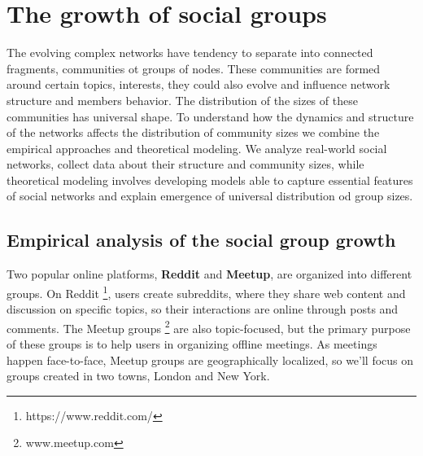 \chapter{The growth of social groups}
\label{Ch:Groups}

The evolving complex networks have tendency to separate into connected fragments, communities ot groups of nodes. These communities are formed around certain topics, interests, they could also evolve and influence network structure and members behavior. The distribution of the sizes of these communities has universal shape. To understand how the dynamics and structure of the networks affects the distribution of community sizes we combine the empirical approaches and theoretical modeling. We analyze real-world social networks, collect data about their structure and community sizes, while theoretical modeling involves developing models able to capture essential features of social networks and explain emergence of universal distribution od group sizes.


\section{Empirical analysis of the social group growth}

Two popular online platforms, \textbf{Reddit} and \textbf{Meetup}, are organized into different groups. On Reddit \footnote{https://www.reddit.com/}, users create subreddits, where they share web content and discussion on specific topics, so their interactions are online through posts and comments. The Meetup groups \footnote{www.meetup.com} are also topic-focused, but the primary purpose of these groups is to help users in organizing offline meetings. As meetings happen face-to-face, Meetup groups are geographically localized, so we'll focus on groups created in two towns, London and New York.  

